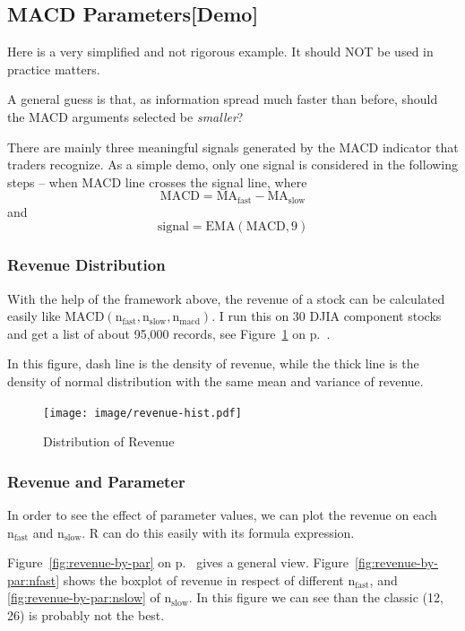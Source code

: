 \documentclass[12pt,a4paper]{article}
\begin{document}
\subsection{MACD Parameters[Demo]}
Here is a very simplified and not rigorous example. 
It should NOT be used in practice matters.

A general guess is that, as information spread much faster than before,
should the MACD arguments selected be \emph{smaller}?

There are mainly three meaningful signals generated by the MACD indicator
that traders recognize. As a simple demo, only one signal is considered
in the following steps -- when MACD line crosses the signal line, where 
\[\mathrm{MACD = MA_{fast} - MA_{slow}} \]
and
\[\mathrm{signal = EMA(MACD, 9)}\]

\subsubsection{Revenue Distribution}
With the help of the framework above, the revenue of a stock 
can be calculated easily like $\mathrm{MACD(n_{fast}, n_{slow}, n_{macd})}$.
I run this on 30 DJIA component stocks and get a list of about 95,000 
records, see Figure~\ref{fig:revenue} on p.~\pageref{fig:revenue}.


In this figure, dash line is the density of revenue, 
while the thick line is the density of 
normal distribution with the same mean and variance of revenue.

\begin{figure}[H]
\centering
\texttt{[image: image/revenue-hist.pdf]}
\caption{Distribution of Revenue\label{fig:revenue}}
\end{figure}


\subsubsection{Revenue and Parameter}
In order to see the effect of parameter values, 
we can plot the revenue on each $\mathrm{n_{fast}}$ 
and $\mathrm{n_{slow}}$. R can do
this easily with its formula expression.

Figure~\ref{fig:revenue-by-par} on p.~\pageref{fig:revenue-by-par}
gives a general view. Figure~\ref{fig:revenue-by-par:nfast} shows the 
boxplot of revenue in respect of different $\mathrm{n_{fast}}$, and 
\ref{fig:revenue-by-par:nslow} of $\mathrm{n_{slow}}$. 
In this figure we can see than the 
classic (12, 26) is probably not the best.
\end{document}
